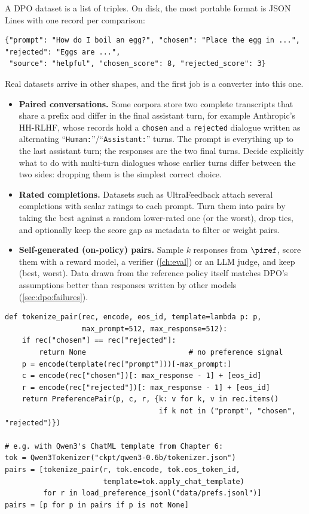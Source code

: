 A DPO dataset is a list of triples. On disk, the most portable format is JSON Lines with one
record per comparison:
\begin{lstlisting}[style=plain]
{"prompt": "How do I boil an egg?", "chosen": "Place the egg in ...", "rejected": "Eggs are ...",
 "source": "helpful", "chosen_score": 8, "rejected_score": 3}
\end{lstlisting}
Real datasets arrive in other shapes, and the first job is a converter into this one.
\begin{itemize}
\item \textbf{Paired conversations.} Some corpora store two complete transcripts that share a
  prefix and differ in the final assistant turn, for example Anthropic's HH-RLHF, whose records hold a
  \texttt{chosen} and a \texttt{rejected} dialogue written as alternating
  ``\texttt{Human:}''/``\texttt{Assistant:}'' turns. The prompt is everything up to the last assistant
  turn; the responses are the two final turns. Decide explicitly what to do with multi-turn
  dialogues whose earlier turns differ between the two sides: dropping them is the simplest correct
  choice.
\item \textbf{Rated completions.} Datasets such as UltraFeedback attach several completions with
  scalar ratings to each prompt. Turn them into pairs by taking the best against a random
  lower-rated one (or the worst), drop ties, and optionally keep the score gap as metadata to filter
  or weight pairs.
\item \textbf{Self-generated (on-policy) pairs.} Sample $k$ responses from $\piref$, score them with
  a reward model, a verifier (\cref{ch:eval}) or an LLM judge, and keep (best, worst). Data drawn
  from the reference policy itself matches DPO's assumptions better than responses written by other
  models (\cref{sec:dpo:failures}).
\end{itemize}

\begin{lstlisting}[caption={Loading JSONL pairs and tokenising them with a chat template. Prompts are truncated from the left (keep the latest turns), responses from the right; EOS is appended to both responses.},label={lst:dpo:tokenize}]
def tokenize_pair(rec, encode, eos_id, template=lambda p: p,
                  max_prompt=512, max_response=512):
    if rec["chosen"] == rec["rejected"]:
        return None                        # no preference signal
    p = encode(template(rec["prompt"]))[-max_prompt:]
    c = encode(rec["chosen"])[: max_response - 1] + [eos_id]
    r = encode(rec["rejected"])[: max_response - 1] + [eos_id]
    return PreferencePair(p, c, r, {k: v for k, v in rec.items()
                                    if k not in ("prompt", "chosen", "rejected")})

# e.g. with Qwen3's ChatML template from Chapter 6:
tok = Qwen3Tokenizer("ckpt/qwen3-0.6b/tokenizer.json")
pairs = [tokenize_pair(r, tok.encode, tok.eos_token_id,
                       template=tok.apply_chat_template)
         for r in load_preference_jsonl("data/prefs.jsonl")]
pairs = [p for p in pairs if p is not None]
\end{lstlisting}

